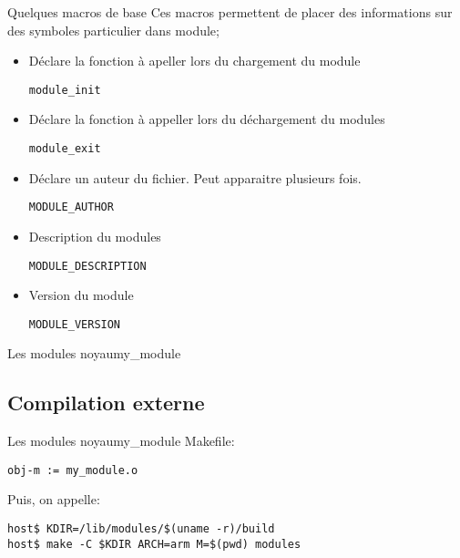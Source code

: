 \begin{frame}[fragile=singleslide]{Quelques macros de base}
  Ces macros  permettent de placer  des informations sur  des symboles
  particulier dans module;
  \begin{itemize}
  \item Déclare la fonction à apeller lors du chargement du module
    \begin{lstlisting}
module_init
    \end{lstlisting}
  \item Déclare la fonction à appeller lors du déchargement du modules
    \begin{lstlisting}
module_exit
    \end{lstlisting}
  \item Déclare un auteur du fichier. Peut apparaitre plusieurs fois.
    \begin{lstlisting}
MODULE_AUTHOR
    \end{lstlisting}
  \item Description du modules
    \begin{lstlisting}
MODULE_DESCRIPTION
    \end{lstlisting}
  \item Version du module
    \begin{lstlisting}
MODULE_VERSION
    \end{lstlisting}
  \end{itemize}
\end{frame}

\begin{frame}[fragile=singleslide]{Les modules noyau}{my\_module}
  
\end{frame}


\subsection{Compilation externe}

\begin{frame}[fragile=singleslide]{Les modules noyau}{my\_module}
  Makefile:
  \begin{lstlisting}
obj-m := my_module.o
  \end{lstlisting}
  Puis, on appelle:
  \begin{lstlisting}
host$ KDIR=/lib/modules/$(uname -r)/build
host$ make -C $KDIR ARCH=arm M=$(pwd) modules
  \end{lstlisting} %
\end{frame}

